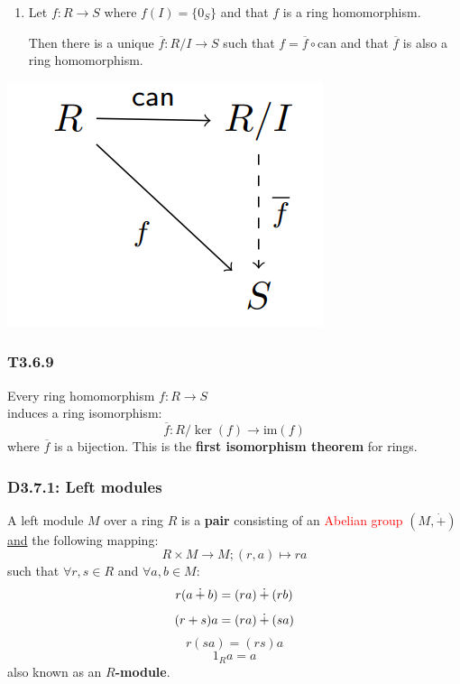 \documentclass{article}
\begin{document}
\begin{multicols*}{3}
\begin{enumerate}
    \item Let $f:R\rightarrow S$ where $f(I)=\{0_S\}$ and
    that $f$ is a ring homomorphism.
    
    Then there is
    a unique $\overline{f}:R/I\rightarrow S$
    such that $f=\overline{f}\circ\text{can}$ and that
    $\overline{f}$ is also a ring homomorphism.
\end{enumerate}
\begin{center}
    \includegraphics[scale=0.5]{f01.png}
\end{center}

\subsubsection*{T3.6.9}
Every ring homomorphism $f:R\rightarrow S$ \\
induces a ring isomorphism:
$$\overline{f}:R/\ker(f)\rightarrow\text{im}(f)$$
where $\overline{f}$ is a bijection. This is
the \textbf{first isomorphism theorem} for rings.

\subsubsection*{D3.7.1: Left modules}
A left module $M$ over a ring $R$ is a \textbf{pair} consisting
of an \textcolor{red}{Abelian group} $(M,\dot{+})$
\underline{and} the following mapping:
$$R\times M\rightarrow M;(r,a)\mapsto ra$$
such that $\forall r,s\in R$ and $\forall a,b\in M$:
$$r(a\hspace{0.03in}\dot{+}\hspace{0.03in}b)
=(ra)\hspace{0.03in}\dot{+}\hspace{0.03in}(rb)$$
$$(r+s)a=(ra)\hspace{0.03in}\dot{+}\hspace{0.03in}(sa)$$
$$r(sa)=(rs)a$$
$$1_R a=a$$
also known as an \textbf{$R$-module}.

\end{multicols*}
\end{document}
